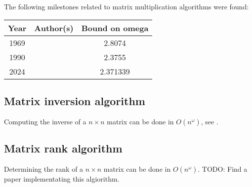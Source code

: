 \noindent
The following milestones related to matrix multiplication algorithms were found:
\begin{center}
  \begin{tabular}{|c|c|c|}
    \hline
    Year & Author(s) & Bound on omega \\
    \hline
    1969 & \citet{Strassen1969} & 2.8074 \\ 
    1990 & \citet{COPPERSMITH1990} & 2.3755 \\
    2024 & \citet{2024asymmetryyieldsfastermatrix} & 2.371339 \\
    \hline
  \end{tabular}
\end{center}

\subsection{Matrix inversion algorithm}

Computing the inverse of a \(n \times n\) matrix can be done in \(O(n^\omega)\), see \citet[Theorem 28.2]{CLRS}.

\subsection{Matrix rank algorithm}

Determining the rank of a \(n \times n\) matrix can be done in \(O(n^\omega)\).
TODO: Find a paper implementating this algiorithm.
